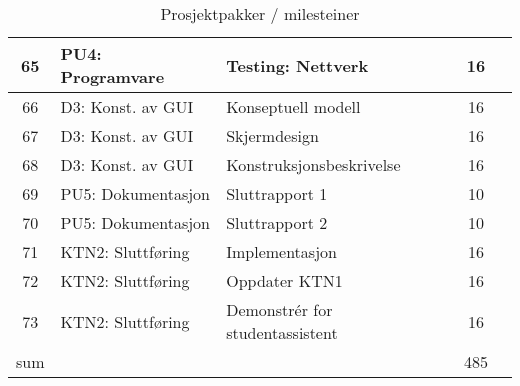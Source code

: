 \begin{table}
\begin{tabularx}{1.3\textwidth}{|c|l|X|c|c|}
	65 & PU4: Programvare & Testing: Nettverk & 16 & \\ \hline
	66 & D3: Konst. av GUI & Konseptuell modell & 16 & \\ \hline
	67 & D3: Konst. av GUI & Skjermdesign & 16 & \\ \hline
	68 & D3: Konst. av GUI & Konstruksjonsbeskrivelse & 16 & \\ \hline
	69 & PU5: Dokumentasjon & Sluttrapport  1& 10 & \\ \hline
	70 & PU5: Dokumentasjon & Sluttrapport  2& 10 & \\ \hline
	71 & KTN2: Sluttføring & Implementasjon & 16 & \\ \hline
	72 & KTN2: Sluttføring & Oppdater KTN1 & 16 & \\ \hline
	73 & KTN2: Sluttføring & Demonstrér for studentassistent & 16 & \\ \hline
	sum & & & 485 & \\ \hline \hline
	\end{tabularx}
\caption {Prosjektpakker / milesteiner}
\end{table}

